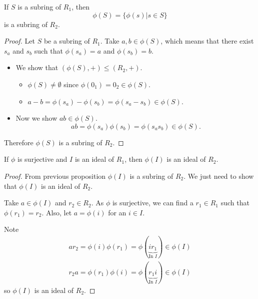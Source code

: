 \begin{proposition}\label{prop-homomorphism-on-subring-is-subring}
    If $S$ is a subring of $R_1$, then
    \[
        \phi(S) = \{\phi(s) | s \in S\}
    \]
    is a subring of $R_2$.
\end{proposition}
\begin{proof}
    Let $S$ be a subring of $R_1$. Take $a, b \in \phi(S)$, which means that there exist $s_a$ and $s_b$ such that $\phi(s_a) = a$ and $\phi(s_b) = b$.
    \begin{itemize}
        \item We show that $(\phi(S), +) \leq (R_2, +)$.
        \begin{itemize}
            \item $\phi(S) \neq \emptyset$ since $\phi(0_1) = 0_2 \in \phi(S)$.
            \item $a - b = \phi(s_a) - \phi(s_b) = \phi(s_a-s_b) \in \phi(S)$.
        \end{itemize}

        \item Now we show $ab \in \phi(S)$.
        \[
            ab = \phi(s_a)\phi(s_b) = \phi(s_as_b) \in \phi(S).
        \]
    \end{itemize}
    Therefore $\phi(S)$ is a subring of $R_2$.
\end{proof}

\begin{proposition}
    If $\phi$ is surjective and $I$ is an ideal of $R_1$, then $\phi(I)$ is an ideal of $R_2$.
\end{proposition}
\begin{proof}
    From previous proposition $\phi(I)$ is a subring of $R_2$. We just need to show that $\phi(I)$ is an ideal of $R_2$.

    Take $a \in \phi(I)$ and $r_2 \in R_2$. As $\phi$ is surjective, we can find a $r_1 \in R_1$ such that $\phi(r_1) = r_2$. Also, let $a = \phi(i)$ for an $i \in I$.

    Note
    \begin{align*}
        ar_2 = \phi(i)\phi(r_1) = \phi(\underbrace{ir_1}_{\text{In }I}) \in \phi(I)\\
        r_2a = \phi(r_1)\phi(i) = \phi(\underbrace{r_1i}_{\text{In }I}) \in \phi(I)
    \end{align*}
    so $\phi(I)$ is an ideal of $R_2$.
\end{proof}

